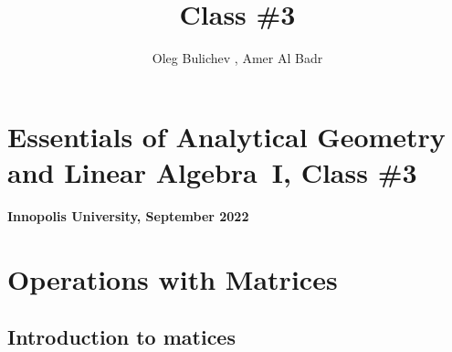 \documentclass[a4paper,10pt]{article}
\title{Class \#3}
\author{Oleg Bulichev , Amer Al Badr}
\date{}
\begin{document}
\section*{Essentials of Analytical Geometry and Linear Algebra~I, Class \#3}
\noindent\textbf{Innopolis University, September 2022}
\\

\section{Operations with Matrices}
\subsection{Introduction to matices}
\end{document}
